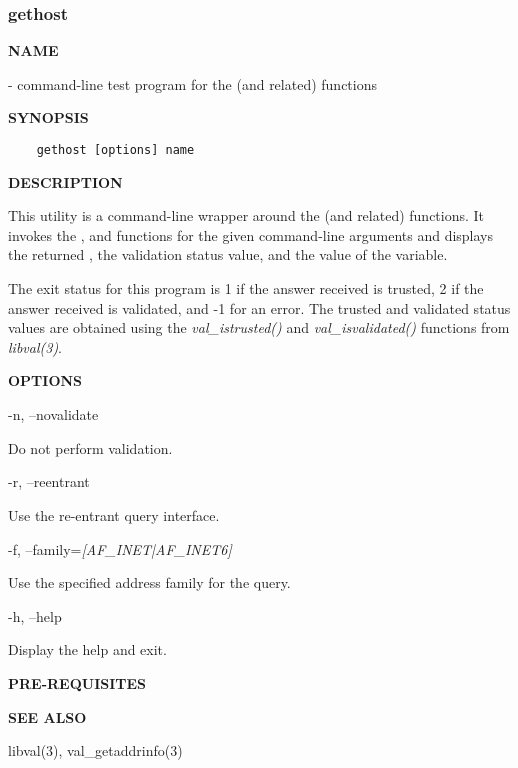\clearpage

\subsubsection{gethost}

{\bf NAME}

 - command-line test program for the 
(and related) functions 

{\bf SYNOPSIS}

\begin{verbatim}
    gethost [options] name
\end{verbatim}

{\bf DESCRIPTION}

This utility is a command-line wrapper around the 
(and related) functions.  It invokes the ,
 and  functions for
the given command-line arguments and displays the returned ,
the validation status value, and the value of the  variable.

The exit status for this program is 1 if the answer received is trusted, 2 if
the answer received is validated, and -1 for an error.  The trusted and
validated status values are obtained using the {\it val\_istrusted()} and
{\it val\_isvalidated()} functions from {\it libval(3)}.

{\bf OPTIONS}

\begin{description}

\item -n, --novalidate\verb" "

Do not perform validation.

\item -r, --reentrant\verb" "

Use the re-entrant query interface.

\item -f, --family={\it [AF\_INET|AF\_INET6]}\verb" "

Use the specified address family for the query. 

\item -h, --help\verb" "

Display the help and exit.

\end{description}

{\bf PRE-REQUISITES}


{\bf SEE ALSO}

libval(3), val\_getaddrinfo(3)


